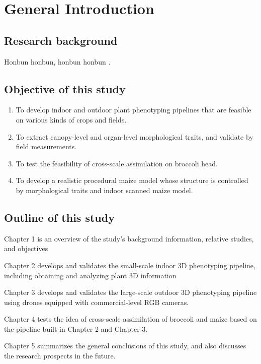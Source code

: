 \chapter{General Introduction}

\section{Research background}

Honbun honbun, honbun honbun \citep{guo_deep_2019, zhao_crop_2019}. 


\section{Objective of this study}

\begin{enumerate}
    \item To develop indoor and outdoor plant phenotyping pipelines that are feasible on various kinds of crops and fields. 
    \item To extract canopy-level and organ-level morphological traits, and validate by field measurements.
    \item To test the feasibility of cross-scale assimilation on broccoli head.
    \item To develop a realistic procedural maize model whose structure is controlled by morphological traits and indoor scanned maize model.
\end{enumerate}


\section{Outline of this study}

Chapter 1 is an overview of the study's background information, relative studies, and objectives

Chapter 2 develops and validates the small-scale indoor 3D phenotyping pipeline, including obtaining and analyzing plant 3D information

Chapter 3 develops and validates the large-scale outdoor 3D phenotyping pipeline using drones equipped with commercial-level RGB cameras.

Chapter 4 tests the idea of cross-scale assimilation of broccoli and maize based on the pipeline built in Chapter 2 and Chapter 3.

Chapter 5 summarizes the general conclusions of this study, and also discusses the research prospects in the future.